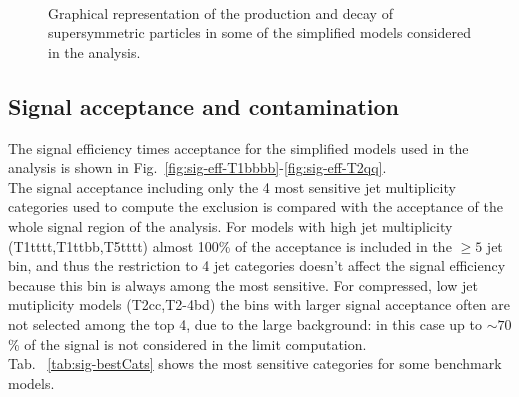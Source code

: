 \begin{figure}[h!]
\begin{center}
     ~~
    \caption{
      Graphical representation of the production and decay of supersymmetric particles in some of the 
      simplified models considered in the analysis. 
    }
    \label{fig:simplified-models}
  \end{center}
\end{figure}



\subsection{Signal acceptance and contamination}
\label{sec:sig-accept-contam}
The signal efficiency times acceptance for the simplified models used in the analysis 
is shown in Fig.~\ref{fig:sig-eff-T1bbbb}-\ref{fig:sig-eff-T2qq}. \\
The signal acceptance including only the 4 most sensitive jet multiplicity categories used to compute the exclusion 
is compared with the acceptance of the whole signal region of the analysis. 
For models with high jet multiplicity (T1tttt,T1ttbb,T5tttt) almost 100\% of the acceptance is 
included in the $\geq5$ jet bin, and thus the restriction to 4 jet categories doesn't affect the signal efficiency 
because this bin is always among the most sensitive.  
For compressed, low jet mutiplicity models (T2cc,T2-4bd) the bins with larger signal acceptance often are not 
selected among the top 4, due to the large background: in this case up to $\sim70$\% of the signal is not 
considered in the limit computation. \\
Tab. ~\ref{tab:sig-bestCats} shows the most sensitive categories for some benchmark models. 

